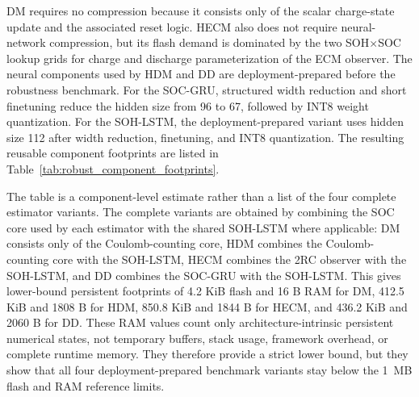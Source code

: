 \documentclass[
    a4paper,
    12pt,
    titlepage,
    bibliography=totoc,
    twoside=on,
    parskip=false,
    numbers=noenddot,
    cleardoublepage=empty,
    DIV=12,
    BCOR=12.0mm,
    headheight=36pt,
    headings=openright
]{scrreprt}
\begin{document}
DM requires no compression because it consists only of the scalar charge-state update and the associated reset logic. HECM also does not require neural-network compression, but its flash demand is dominated by the two SOH$\times$SOC lookup grids for charge and discharge parameterization of the ECM observer. The neural components used by HDM and DD are deployment-prepared before the robustness benchmark. For the SOC-GRU, structured width reduction and short finetuning reduce the hidden size from 96 to 67, followed by INT8 weight quantization. For the SOH-LSTM, the deployment-prepared variant uses hidden size 112 after width reduction, finetuning, and INT8 quantization. The resulting reusable component footprints are listed in Table~\ref{tab:robust_component_footprints}.

The table is a component-level estimate rather than a list of the four complete estimator variants. The complete variants are obtained by combining the SOC core used by each estimator with the shared SOH-LSTM where applicable: DM consists only of the Coulomb-counting core, HDM combines the Coulomb-counting core with the SOH-LSTM, HECM combines the 2RC observer with the SOH-LSTM, and DD combines the SOC-GRU with the SOH-LSTM. This gives lower-bound persistent footprints of 4.2 KiB flash and 16 B RAM for DM, 412.5 KiB and 1808 B for HDM, 850.8 KiB and 1844 B for HECM, and 436.2 KiB and 2060 B for DD. These RAM values count only architecture-intrinsic persistent numerical states, not temporary buffers, stack usage, framework overhead, or complete runtime memory. They therefore provide a strict lower bound, but they show that all four deployment-prepared benchmark variants stay below the \SI{1}{MB} flash and RAM reference limits.
\end{document}

